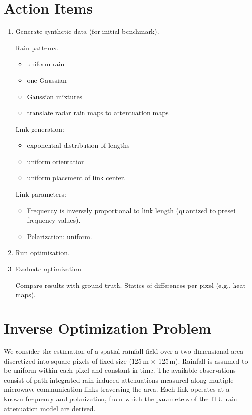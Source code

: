 \documentclass[12pt]{article}
\begin{document}
\section{Action Items}
\begin{enumerate}
    \item Generate synthetic data (for initial benchmark). 

\medskip
\noindent
Rain patterns:    \begin{itemize}
        \item uniform rain
        \item one Gaussian 
        \item Gaussian mixtures
        \item translate radar rain maps to attentuation maps.
    \end{itemize}

Link generation:
\begin{itemize}
    \item exponential distribution of lengths
    \item uniform orientation
    \item uniform placement of link center. 
\end{itemize}

Link parameters:
\begin{itemize}
    \item Frequency is inversely proportional to link length (quantized to preset frequency values).

    \item Polarization: uniform.    
\end{itemize}

\item Run optimization.

\item Evaluate optimization.

Compare results with ground truth. Statics of differences per pixel (e.g., heat maps).
\end{enumerate}

\section{Inverse Optimization Problem}


We consider the estimation of a spatial rainfall field over a two-dimensional area discretized into square pixels of fixed size (125\,m $\times$ 125\,m). Rainfall is assumed to be uniform within each pixel and constant in time. The available observations consist of path-integrated rain-induced attenuations measured along multiple microwave communication links traversing the area. Each link operates at a known frequency and polarization, from which the parameters of the ITU rain attenuation model are derived.
\end{document}

